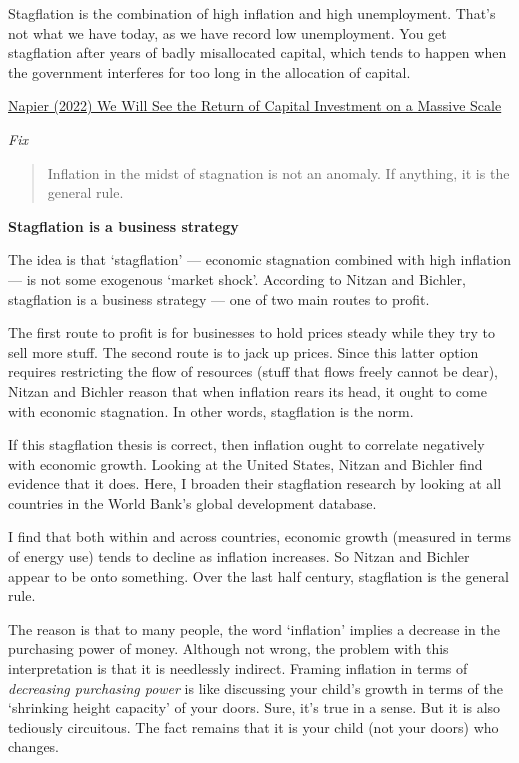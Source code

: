 \documentclass[
]{book}
\begin{document}
Stagflation is the combination of high inflation and high unemployment. That's not what we have today, as we have record low unemployment. You get stagflation after years of badly misallocated capital, which tends to happen when the government interferes for too long in the allocation of capital.

\href{https://themarket.ch/interview/russell-napier-the-world-will-experience-a-capex-boom-ld.7606}{Napier (2022) We Will See the Return of Capital Investment on a Massive Scale}

\emph{Fix}

\begin{quote}
Inflation in the midst of stagnation is not an anomaly.
If anything, it is the general rule.
\end{quote}

\textbf{Stagflation is a business strategy}

The idea is that `stagflation' --- economic stagnation combined with high inflation --- is not some exogenous `market shock'. According to Nitzan and Bichler, stagflation is a business strategy --- one of two main routes to profit.

The first route to profit is for businesses to hold prices steady while they try to sell more stuff. The second route is to jack up prices. Since this latter option requires restricting the flow of resources (stuff that flows freely cannot be dear), Nitzan and Bichler reason that when inflation rears its head, it ought to come with economic stagnation. In other words, stagflation is the norm.

If this stagflation thesis is correct, then inflation ought to correlate negatively with economic growth. Looking at the United States, Nitzan and Bichler find evidence that it does. Here, I broaden their stagflation research by looking at all countries in the World Bank's global development database.

I find that both within and across countries, economic growth (measured in terms of energy use) tends to decline as inflation increases. So Nitzan and Bichler appear to be onto something. Over the last half century, stagflation is the general rule.

The reason is that to many people, the word `inflation' implies a decrease in the purchasing power of money. Although not wrong, the problem with this interpretation is that it is needlessly indirect. Framing inflation in terms of \emph{decreasing purchasing power} is like discussing your child's growth in terms of the `shrinking height capacity' of your doors. Sure, it's true in a sense. But it is also tediously circuitous. The fact remains that it is your child (not your doors) who changes.
\end{document}
